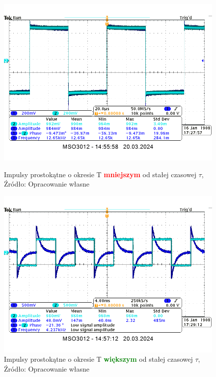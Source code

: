 \documentclass{article}
\begin{document}
        \begin{figure}[!ht]
          \centering
          \begin{minipage}{.4\textwidth}
            \centering
            \includegraphics[scale=0.25]{grafiki/P_T_mniejszy.png}
            \caption{Impulsy prostokątne o okresie T \textbf{\textcolor{red}{mniejszym}} od stałej czasowej $\tau$,
              \\Źródło: Opracowanie własne}
          \end{minipage}
          \begin{minipage}{.4\textwidth}
            \centering
            \includegraphics[scale=0.25]{grafiki/P_T_wiekszy.png}
            \caption{Impulsy prostokątne o okresie T \textbf{\textcolor{green}{większym}} od stałej czasowej $\tau$,
            \\Źródło: Opracowanie własne}
          \end{minipage}
        \end{figure}
\end{document}
